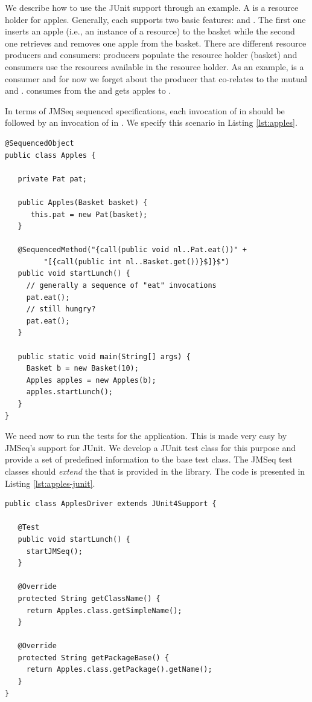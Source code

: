 We describe how to use the JUnit support through an example. 
A  is a resource holder for apples. Generally, each
 supports two basic features:  and
. The first one inserts an apple (i.e., an instance of a
resource) to the basket while the second one retrieves and removes one
apple from the basket. There are different resource producers and
consumers: producers populate the resource holder (basket) and
consumers use the resources available in the resource holder. As an
example,  is a consumer and for now we forget about the
producer that co-relates to the mutual  and
.  consumes from the  and gets
apples to .

In terms of JMSeq sequenced specifications, each invocation of
 in  should be followed by an invocation of
 in . We specify this scenario in Listing
\ref{lst:apples}.

\lstset{language=Java}
\begin{lstlisting}[label=lst:apples, caption=Apples JMSeq Specification]
@SequencedObject
public class Apples {

   private Pat pat;
   
   public Apples(Basket basket) {
      this.pat = new Pat(basket);
   }
  
   @SequencedMethod("{call(public void nl..Pat.eat())" +
         "[{call(public int nl..Basket.get())}$]}$")
   public void startLunch() {
     // generally a sequence of "eat" invocations
     pat.eat();
     // still hungry?
     pat.eat();
   }

   public static void main(String[] args) {
     Basket b = new Basket(10);
     Apples apples = new Apples(b);
     apples.startLunch();
   }
}
\end{lstlisting}

We need now to run the tests for the  application.
This is made very easy by JMSeq's support for JUnit. 
We develop a JUnit
test class for this purpose and provide a set of predefined information
to the base test class. The JMSeq test classes should \textsl{extend}
the  that is provided in the library. The code is
presented in Listing \ref{lst:apples-junit}.

\lstset{language=Java}
\begin{lstlisting}[label=lst:apples-junit, caption=Apples JMSeq JUnit
Test Unit]
public class ApplesDriver extends JUnit4Support {

   @Test
   public void startLunch() {
     startJMSeq();
   }

   @Override
   protected String getClassName() {
     return Apples.class.getSimpleName();
   }

   @Override
   protected String getPackageBase() {
     return Apples.class.getPackage().getName();
   }
}
\end{lstlisting}

